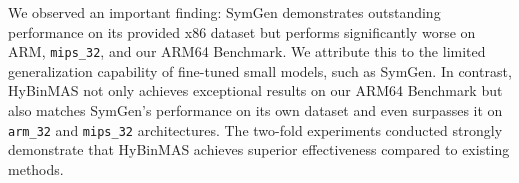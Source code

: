 \documentclass[acmsmall,screen,review,anonymous]{acmart} %
\begin{document}
We observed an important finding: SymGen demonstrates outstanding performance on its provided x86 dataset but performs significantly worse on ARM, \texttt{mips\_32}, and our ARM64 Benchmark. We attribute this to the limited generalization capability of fine-tuned small models, such as SymGen. In contrast, HyBinMAS not only achieves exceptional results on our ARM64 Benchmark but also matches SymGen’s performance on its own dataset and even surpasses it on \texttt{arm\_32} and \texttt{mips\_32} architectures. The two-fold experiments conducted strongly demonstrate that HyBinMAS achieves superior effectiveness compared to existing methods.

\end{document}
